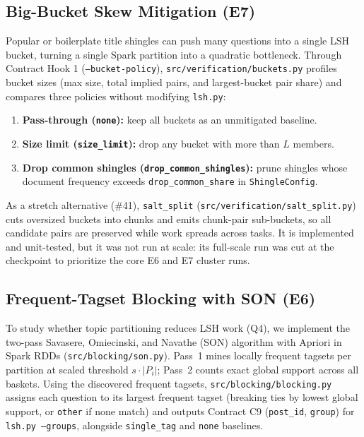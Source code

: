 {\subsection{Big-Bucket Skew Mitigation (E7)}
Popular or boilerplate title shingles can push many questions into a single LSH bucket, turning a
single Spark partition into a quadratic bottleneck. Through Contract Hook 1
(\texttt{--bucket-policy}), \texttt{src/verification/buckets.py} profiles bucket sizes (max size,
total implied pairs, and largest-bucket pair share) and compares three policies without modifying
\texttt{lsh.py}:
\begin{enumerate}
  \item \textbf{Pass-through (\texttt{none}):} keep all buckets as an unmitigated baseline.
  \item \textbf{Size limit (\texttt{size\_limit}):} drop any bucket with more than $L$ members.
  \item \textbf{Drop common shingles (\texttt{drop\_common\_shingles}):} prune shingles whose
        document frequency exceeds \texttt{drop\_common\_share} in \texttt{ShingleConfig}.
\end{enumerate}
As a stretch alternative (\#41), \texttt{salt\_split} (\texttt{src/verification/salt\_split.py})
cuts oversized buckets into chunks and emits chunk-pair sub-buckets, so all candidate pairs are
preserved while work spreads across tasks. It is implemented and unit-tested, but it was not run at
scale: its full-scale run was cut at the checkpoint to prioritize the core E6 and E7 cluster runs.

\subsection{Frequent-Tagset Blocking with SON (E6)}
To study whether topic partitioning reduces LSH work (Q4), we implement the two-pass Savasere,
Omiecinski, and Navathe (SON) algorithm \cite{savasere1995son} with Apriori
\cite{agrawal1994apriori} in Spark RDDs (\texttt{src/blocking/son.py}). Pass~1 mines locally
frequent tagsets per partition at scaled threshold $s \cdot |P_i|$; Pass~2 counts exact global
support across all baskets. Using the discovered frequent tagsets, \texttt{src/blocking/\allowbreak blocking.py}
assigns each question to its largest frequent tagset (breaking ties by lowest global support, or
\texttt{other} if none match) and outputs Contract C9 (\texttt{post\_id}, \texttt{group}) for
\texttt{lsh.py --groups}, alongside \texttt{single\_tag} and \texttt{none} baselines.
}

